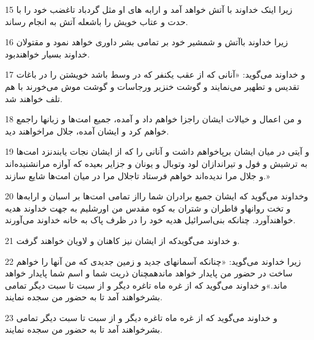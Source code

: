 \par 15 زیرا اینک خداوند با آتش خواهد آمد و ارابه های او مثل گردباد تاغضب خود را با حدت و عتاب خویش را باشعله آتش به انجام رساند.
\par 16 زیرا خداوند باآتش و شمشیر خود بر تمامی بشر داوری خواهد نمود و مقتولان خداوند بسیار خواهندبود.
\par 17 و خداوند می‌گوید: «آنانی که از عقب یکنفر که در وسط باشد خویشتن را در باغات تقدیس و تطهیر می‌نمایند و گوشت خنزیر ورجاسات و گوشت موش می‌خورند با هم تلف خواهند شد.
\par 18 و من اعمال و خیالات ایشان راجزا خواهم داد و آمده، جمیع امت‌ها و زبانها راجمع خواهم کرد و ایشان آمده، جلال مراخواهند دید.
\par 19 و آیتی در میان ایشان برپاخواهم داشت و آنانی را که از ایشان نجات یابندنزد امت‌ها به ترشیش و فول و تیراندازان لود وتوبال و یونان و جزایر بعیده که آوازه مرانشنیده‌اند و جلال مرا ندیده‌اند خواهم فرستاد تاجلال مرا در میان امت‌ها شایع سازند.»
\par 20 وخداوند می‌گوید که ایشان جمیع برادران شما رااز تمامی امت‌ها بر اسبان و ارابه‌ها و تخت روانهاو قاطران و شتران به کوه مقدس من اورشلیم به جهت خداوند هدیه خواهند‌آورد. چنانکه بنی‌اسرائیل هدیه خود را در ظرف پاک به خانه خداوند می‌آورند.
\par 21 و خداوند می‌گویدکه از ایشان نیز کاهنان و لاویان خواهند گرفت.
\par 22 زیرا خداوند می‌گوید: «چنانکه آسمانهای جدید و زمین جدیدی که من آنها را خواهم ساخت در حضور من پایدار خواهد ماندهمچنان ذریت شما و اسم شما پایدار خواهد ماند.»و خداوند می‌گوید که از غره ماه تاغره دیگر و از سبت تا سبت دیگر تمامی بشرخواهند آمد تا به حضور من سجده نمایند.
\par 23 و خداوند می‌گوید که از غره ماه تاغره دیگر و از سبت تا سبت دیگر تمامی بشرخواهند آمد تا به حضور من سجده نمایند.


